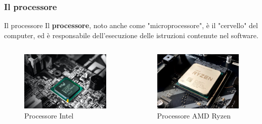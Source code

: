 \subsubsection[Il processore]{Il processore}
\begin{frame}
	
	\begin{block}{Il processore}
		Il \textbf{processore}, noto anche come "microprocessore", è il "cervello" del computer, ed è responsabile dell'esecuzione delle istruzioni contenute nel software.
	\end{block}

	\begin{columns}			
		\begin{figure}[!htbp] 
			\centering
			\includegraphics[width=1.0\linewidth]{images/2_le_architetture/intel.jpg}
			\caption{Processore Intel}
			\label{fig:architectures_intel}
		\end{figure}
					
		\begin{figure}[!htbp] 
			\centering
			\includegraphics[width=1.0\linewidth]{images/2_le_architetture/ryzen.jpg}
			\caption{Processore AMD Ryzen}
			\label{fig:architectures_ryzen}
		\end{figure}
		
	\end{columns}
	
\end{frame}



